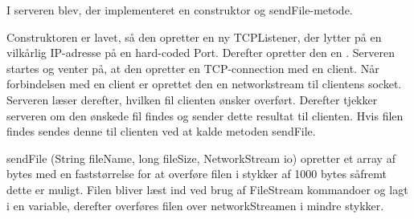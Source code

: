 I serveren blev, der implementeret en construktor og sendFile-metode.

Construktoren er lavet, så den opretter en ny TCPListener, der lytter på en vilkårlig IP-adresse på en hard-coded Port.
Derefter opretter den en . Serveren startes og venter på, at den opretter en TCP-connection med en client.
Når forbindelsen med en client er oprettet den en networkstream til clientens socket. Serveren læser derefter, hvilken fil clienten ønsker overført. 
Derefter tjekker serveren om den ønskede fil findes og sender dette resultat til clienten.
Hvis filen findes sendes denne til clienten ved at kalde metoden sendFile.

sendFile (String fileName, long fileSize, NetworkStream io) opretter et array af bytes med en faststørrelse for at overføre filen i stykker af 1000 bytes såfremt dette er muligt.
Filen bliver læst ind ved brug af FileStream kommandoer og lagt i en variable, derefter overføres filen over networkStreamen i mindre stykker.